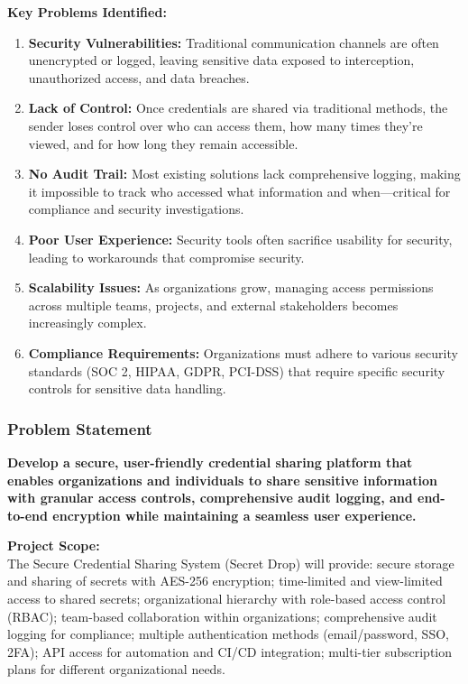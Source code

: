 \documentclass[12pt,a4paper]{article}
\begin{document}
\textbf{Key Problems Identified:}
\begin{enumerate}[leftmargin=*]
  \item \textbf{Security Vulnerabilities:} Traditional communication channels are often unencrypted or logged, leaving sensitive data exposed to interception, unauthorized access, and data breaches.
  \item \textbf{Lack of Control:} Once credentials are shared via traditional methods, the sender loses control over who can access them, how many times they're viewed, and for how long they remain accessible.
  \item \textbf{No Audit Trail:} Most existing solutions lack comprehensive logging, making it impossible to track who accessed what information and when---critical for compliance and security investigations.
  \item \textbf{Poor User Experience:} Security tools often sacrifice usability for security, leading to workarounds that compromise security.
  \item \textbf{Scalability Issues:} As organizations grow, managing access permissions across multiple teams, projects, and external stakeholders becomes increasingly complex.
  \item \textbf{Compliance Requirements:} Organizations must adhere to various security standards (SOC 2, HIPAA, GDPR, PCI-DSS) that require specific security controls for sensitive data handling.
\end{enumerate}

\subsubsection{Problem Statement}

\textbf{Develop a secure, user-friendly credential sharing platform that enables organizations and individuals to share sensitive information with granular access controls, comprehensive audit logging, and end-to-end encryption while maintaining a seamless user experience.}

\textbf{Project Scope:}\\
The Secure Credential Sharing System (Secret Drop) will provide: secure storage and sharing of secrets with AES-256 encryption; time-limited and view-limited access to shared secrets; organizational hierarchy with role-based access control (RBAC); team-based collaboration within organizations; comprehensive audit logging for compliance; multiple authentication methods (email/password, SSO, 2FA); API access for automation and CI/CD integration; multi-tier subscription plans for different organizational needs.
\end{document}
